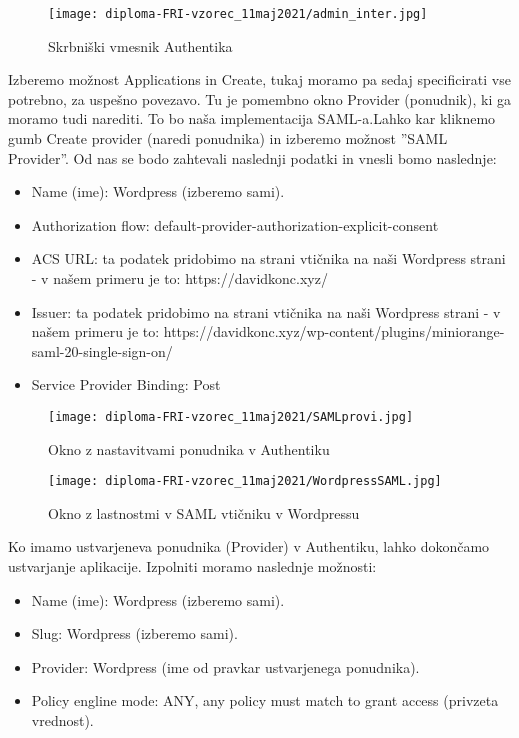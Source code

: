 \documentclass[a4paper,12pt,openright]{book}
\begin{document}
\begin{figure}[H]
\hspace{-3cm}
\texttt{[image: diploma-FRI-vzorec\_11maj2021/admin\_inter.jpg]}
\caption{Skrbniški vmesnik Authentika}
\label{fig}
\end{figure}

Izberemo možnost Applications in Create, tukaj moramo pa sedaj specificirati vse potrebno, za uspešno povezavo. Tu je pomembno okno Provider (ponudnik), ki ga moramo tudi narediti. To bo naša implementacija SAML-a.Lahko kar kliknemo gumb Create provider (naredi ponudnika) in izberemo možnost ''SAML Provider''. 
Od nas se bodo zahtevali naslednji podatki in vnesli bomo naslednje:
\begin{itemize}
    \item Name (ime): Wordpress (izberemo sami).
    \item Authorization flow: default-provider-authorization-explicit-consent
    \item ACS URL: ta podatek pridobimo na strani vtičnika na naši Wordpress strani - v našem primeru je to: https://davidkonc.xyz/
    \item Issuer: ta podatek pridobimo na strani vtičnika na naši Wordpress strani - v našem primeru je to: https://davidkonc.xyz/wp-content/plugins/miniorange-saml-20-single-sign-on/
    \item Service Provider Binding:  Post
\end{itemize}

\begin{figure}[H]
\hspace{-1cm}
\texttt{[image: diploma-FRI-vzorec\_11maj2021/SAMLprovi.jpg]}
\caption{Okno z nastavitvami ponudnika v Authentiku}
\label{fig}
\end{figure}

\begin{figure}[H]
\hspace{-4cm}
\texttt{[image: diploma-FRI-vzorec\_11maj2021/WordpressSAML.jpg]}
\caption{Okno z lastnostmi v SAML vtičniku v Wordpressu}
\label{fig}
\end{figure}

Ko imamo ustvarjeneva ponudnika (Provider) v Authentiku, lahko dokončamo ustvarjanje aplikacije. Izpolniti moramo naslednje možnosti:
\begin{itemize}
    \item Name (ime): Wordpress (izberemo sami).
    \item Slug: Wordpress (izberemo sami).
    \item Provider: Wordpress (ime od pravkar ustvarjenega ponudnika).
    \item Policy engline mode: ANY, any policy must match to grant access (privzeta vrednost). 
\end{itemize}
\end{document}
